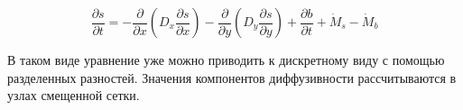 \begin{equation*}
    \frac
        {\partial s}
        {\partial t}
    =
    -
    \frac
        {\partial}
        {\partial x}
    \left(
        D_{x}
        \frac
            {\partial s}
            {\partial x}
    \right)
    -
    \frac
        {\partial}
        {\partial y}
    \left(
        D_{y}
        \frac
            {\partial s}
            {\partial y}
    \right)
    +
    \frac
        {\partial b}
        {\partial t}
    +
    \dot{M}_s
    -
    \dot{M}_b
\end{equation*}

В таком виде уравнение уже можно приводить к дискретному виду
с помощью разделенных разностей. Значения компонентов 
диффузивности рассчитываются в узлах смещенной сетки.
